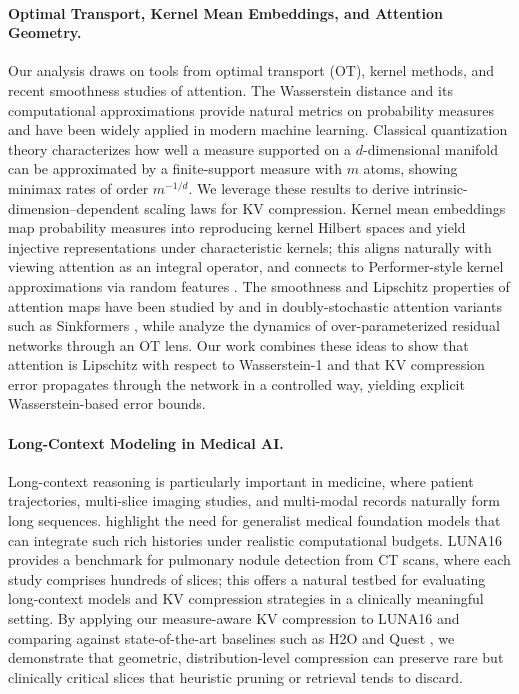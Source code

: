 \documentclass{article}
\theoremstyle{plain}
\theoremstyle{definition}
\theoremstyle{remark}
\begin{document}
\paragraph{Optimal Transport, Kernel Mean Embeddings, and Attention Geometry.}
Our analysis draws on tools from optimal transport (OT), kernel methods, and recent  
smoothness studies of attention.  The Wasserstein distance and its computational  
approximations \citep{villani2009optimal,cuturi2013sinkhorn} provide natural metrics  
on probability measures and have been widely applied in modern machine learning.  
Classical quantization theory \citep{graf2000foundations} characterizes how well a  
measure supported on a $d$-dimensional manifold can be approximated by a finite-support  
measure with $m$ atoms, showing minimax rates of order $m^{-1/d}$.  
We leverage these results to derive intrinsic-dimension–dependent scaling laws for  
KV compression.  
Kernel mean embeddings \citep{muandet2017kernel,sriperumbudur2010hilbert} map probability  
measures into reproducing kernel Hilbert spaces and yield injective representations  
under characteristic kernels; this aligns naturally with viewing attention as an  
integral operator, and connects to Performer-style kernel approximations via random  
features \citep{song2020rethinking,rahimi2007random}.  
The smoothness and Lipschitz properties of attention maps have been studied by  
\citet{castin2024how} and in doubly-stochastic attention variants such as Sinkformers  
\citep{sander2022sinkformers}, while \citet{chizat2018global} analyze the dynamics of  
over-parameterized residual networks through an OT lens.  
Our work combines these ideas to show that attention is Lipschitz with respect to  
Wasserstein-1 and that KV compression error propagates through the network in a  
controlled way, yielding explicit Wasserstein-based error bounds.

\paragraph{Long-Context Modeling in Medical AI.}
Long-context reasoning is particularly important in medicine, where patient trajectories,  
multi-slice imaging studies, and multi-modal records naturally form long sequences.  
\citet{moor2023foundation} highlight the need for generalist medical foundation models  
that can integrate such rich histories under realistic computational budgets.  
LUNA16 \citep{setio2017validation} provides a benchmark for pulmonary nodule detection  
from CT scans, where each study comprises hundreds of slices; this offers a natural  
testbed for evaluating long-context models and KV compression strategies in a  
clinically meaningful setting.  
By applying our measure-aware KV compression to LUNA16 and comparing against  
state-of-the-art baselines such as H2O and Quest \citep{zhang2024h2o,tang2024quest},  
we demonstrate that geometric, distribution-level compression can preserve rare but  
clinically critical slices that heuristic pruning or retrieval tends to discard.
\end{document}
